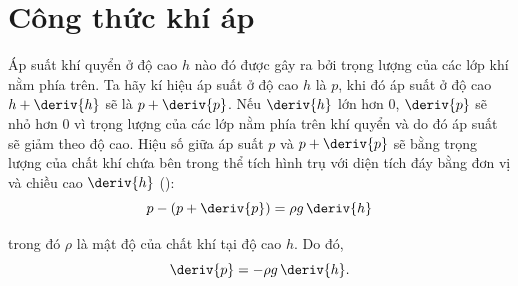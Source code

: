 
\section{Công thức khí áp}\label{sec:10_14}


Áp suất khí quyển ở độ cao $h$ nào đó được gây ra bởi trọng lượng của các lớp khí nằm phía trên. Ta hãy kí hiệu áp suất ở độ cao $h$ là $p$, khi đó áp suất ở độ cao $h+\deriv{h}$ sẽ là $p+\deriv{p}$. Nếu $\deriv{h}$ lớn hơn 0, $\deriv{p}$ sẽ nhỏ hơn 0 vì trọng lượng của các lớp nằm phía trên khí quyển và do đó áp suất sẽ giảm theo độ cao. Hiệu số giữa áp suất $p$ và $p+\deriv{p}$ sẽ bằng trọng lượng của chất khí chứa bên trong thể tích hình trụ với diện tích đáy bằng đơn vị và chiều cao $\deriv{h}$ ():         
\begin{equation*}
	p - (p + \deriv{p}) = \rho g\,\deriv{h}
\end{equation*}

\noindent

trong đó $\rho$ là mật độ của chất khí tại độ cao $h$. Do đó,   
\begin{equation}\label{eq:10_68}
	\deriv{p} = -\rho g\,\deriv{h}.
\end{equation}

